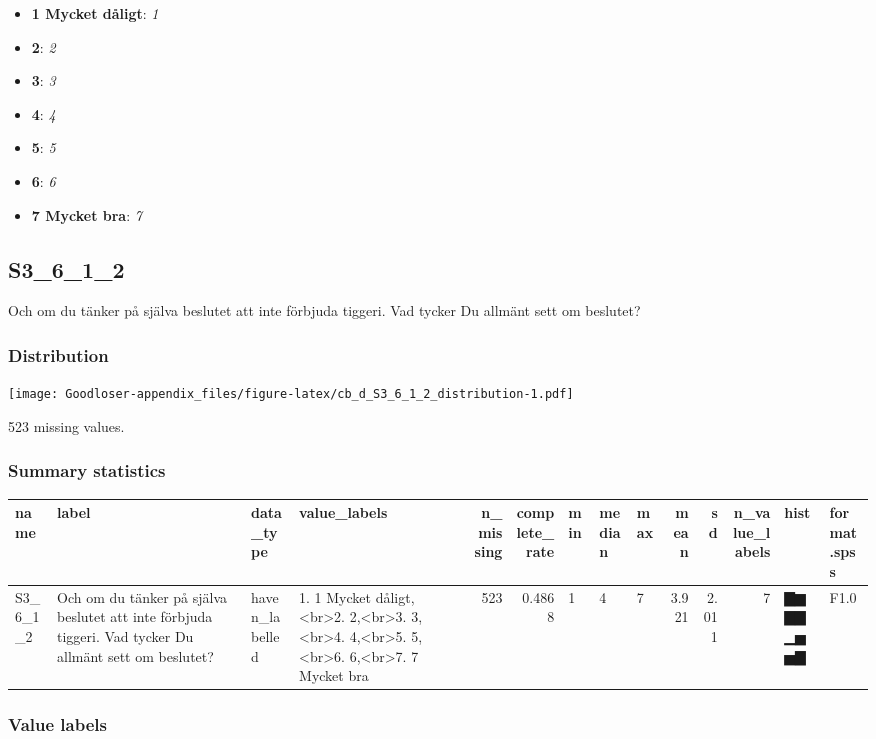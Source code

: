 \documentclass[
]{book}
\providecommand{\tightlist}{%
  \setlength{\itemsep}{0pt}\setlength{\parskip}{0pt}}
\begin{document}
\begin{itemize}
\tightlist
\item
  \textbf{1 Mycket dåligt}: \emph{1}
\item
  \textbf{2}: \emph{2}
\item
  \textbf{3}: \emph{3}
\item
  \textbf{4}: \emph{4}
\item
  \textbf{5}: \emph{5}
\item
  \textbf{6}: \emph{6}
\item
  \textbf{7 Mycket bra}: \emph{7}
\end{itemize}

\hypertarget{S3_6_1_2}{%
\subsection{S3\_6\_1\_2}\label{S3_6_1_2}}

Och om du tänker på själva beslutet att inte förbjuda tiggeri. Vad tycker Du allmänt sett om beslutet?

\hypertarget{S3_6_1_2_distribution}{%
\subsubsection{Distribution}\label{S3_6_1_2_distribution}}

\texttt{[image: Goodloser-appendix\_files/figure-latex/cb\_d\_S3\_6\_1\_2\_distribution-1.pdf]}

523 missing values.

\hypertarget{S3_6_1_2_summary}{%
\subsubsection{Summary statistics}\label{S3_6_1_2_summary}}

\begin{tabular}{l|l|l|l|r|r|l|l|l|r|r|r|l|l}
\hline
name & label & data_type & value_labels & n_missing & complete_rate & min & median & max & mean & sd & n_value_labels & hist & format.spss\\
\hline
S3_6_1_2 & Och om du tänker på själva beslutet att inte förbjuda tiggeri. Vad tycker Du allmänt sett om beslutet? & haven_labelled & 1. 1 Mycket dåligt,<br>2. 2,<br>3. 3,<br>4. 4,<br>5. 5,<br>6. 6,<br>7. 7 Mycket bra & 523 & 0.4868 & 1 & 4 & 7 & 3.921 & 2.011 & 7 & ▇▆▇▇▁▅▅▇ & F1.0\\
\hline
\end{tabular}

\hypertarget{S3_6_1_2_labels}{%
\subsubsection{Value labels}\label{S3_6_1_2_labels}}
\end{document}
